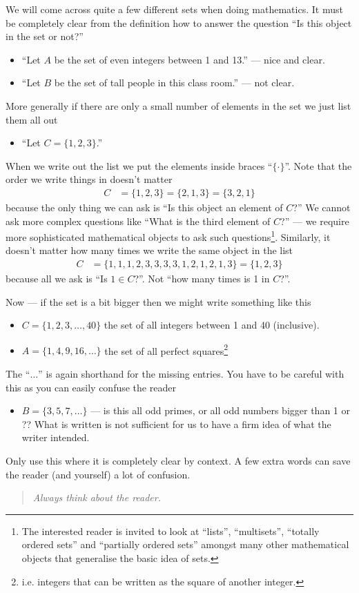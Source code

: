 We will come across quite a few different sets when doing
mathematics. It must be completely clear from the definition how
to answer the question ``Is this object in the set or not?''
\begin{itemize}
\item ``Let $A$ be the set of even integers between 1 and 13.'' --- nice and
clear.
\item ``Let $B$ be the set of tall people in this class room.'' --- not clear.
\end{itemize}
More generally if there are only a small number of elements in the set we just
list them all out
\begin{itemize}
\item ``Let $C = \{1,2,3\}$.''
\end{itemize}
When we write out the list we put the elements inside braces ``$\{ \cdot \}$''.
Note that the order we write things in doesn't matter
\begin{align*}
  C & = \{1,2,3\} = \{2,1,3\} = \{3,2,1\}
\end{align*}
because the only thing we can ask is ``Is this object an element of $C$?'' We
cannot ask more complex questions like ``What is the third element of $C$?'' ---
we require more sophisticated mathematical objects to ask such
questions\footnote{The interested reader is invited to look at ``lists'',
``multisets'', ``totally ordered sets'' and ``partially ordered sets''
amongst many other mathematical objects that generalise the basic idea of
sets.}. Similarly, it doesn't matter how many times we write the same object in
the list
\begin{align*}
  C &= \{1,1,1,2,3,3,3,3,1,2,1,2,1,3\} = \{1,2,3\}
\end{align*}
because all we ask is ``Is $1 \in C$?''. Not ``how many times is 1 in $C$?''.

Now --- if the set is a bit bigger then we might write something like this
\begin{itemize}
\item $C = \{1,2,3,\dots,40\}$ the set of all integers between 1 and 40
(inclusive).
\item $A = \{1,4,9,16,\dots\}$ the set of all perfect squares\footnote{i.e. 
integers that can be written as the square of another integer.}
\end{itemize}
The ``$\dots$'' is again shorthand for the missing entries. You have to be
careful with this as you can easily confuse the reader
\begin{itemize}
\item $B = \{3,5,7,\dots\}$ --- is this all odd primes, or all odd numbers
bigger than 1 or ?? What is written is not sufficient for us to have a firm
idea of what the writer intended.
\end{itemize}
Only use this where it is completely clear by context. A few extra words can
save the reader (and yourself) a lot of confusion.
\begin{quote}
 \emph{Always think about the reader.}
\end{quote}



